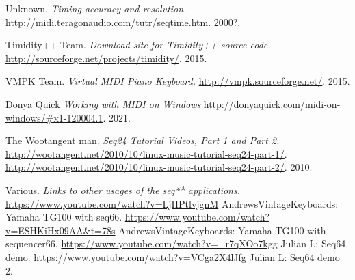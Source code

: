 {\begin{thebibliography}{99}
   Unknown.
   \emph{Timing accuracy and resolution.}
   \url{http://midi.teragonaudio.com/tutr/seqtime.htm}.
   2000?.

   Timidity++ Team.
   \emph{Download site for Timidity++ source code.}
   \url{http://sourceforge.net/projects/timidity/}.
   2015.

   VMPK Team.
   \emph{Virtual MIDI Piano Keyboard.}
   \url{http://vmpk.sourceforge.net/}.
   2015.

   Donya Quick
   \emph{Working with MIDI on Windows}
   \url{http://donyaquick.com/midi-on-windows/#x1-120004.1}.
   2021.

   The Wootangent man.
   \emph{Seq24 Tutorial Videos, Part 1 and Part 2.}
   \url{http://wootangent.net/2010/10/linux-music-tutorial-seq24-part-1/}.
   \url{http://wootangent.net/2010/10/linux-music-tutorial-seq24-part-2/}.
   2010.

   Various.
   \emph{Links to other usages of the seq** applications.}
   \url{https://www.youtube.com/watch?v=LjHPtlvjgnM}
      AndrewsVintageKeyboards: Yamaha TG100 with seq66.
   \url{https://www.youtube.com/watch?v=ESHKiHx09AA&t=78s}
      AndrewsVintageKeyboards: Yamaha TG100 with sequencer66.
   \url{https://www.youtube.com/watch?v=\_r7qXOo7kgg}
      Julian L: Seq64 demo.
   \url{https://www.youtube.com/watch?v=VCga2X4lJfg}
      Julian L: Seq64 demo 2.
\end{thebibliography}
}

